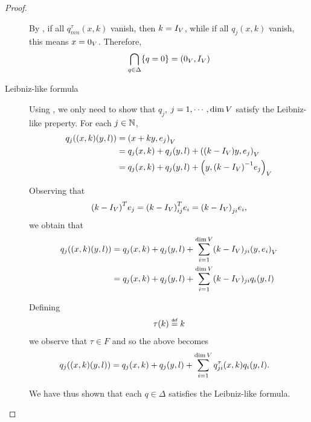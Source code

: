 \begin{proof}
\begin{description}
            By \cite[Lemma 5.11]{Fischer2015},
            if all $q^\tau_{m n}(x, k)$ vanish, then $k = {I_{V}}$,
            while if all $q_j(x, k)$ vanish, this means $x = 0_V$.
            Therefore,
            \begin{align*}
                \bigcap_{q \in \Delta} \{q = 0\} = (0_V, {I_{V}})
            \end{align*}
        \item [Leibniz-like formula]
            Using \cite[Corollary 5.13]{Fischer2015},
            we only need to show that $q_j$, $j = 1, \cdots, \dim V$ satisfy the Leibniz-like preperty.
            For each $j \in \mathbb{N}$,
            \begin{align*}
                q_j((x, k) (y, l))
                &= {\left(x + k y, e_j\right)_{V}}\\
                &= q_j(x, k) + q_j(y, l) + {\left((k - {I_{V}}) y, e_j\right)_{V}}\\
                &= q_j(x, k) + q_j(y, l) + {\left(y, {(k - {I_{V}})}^{-1} e_j\right)_{V}}
            \end{align*}

            Observing that
            \begin{align*}
                {(k - {I_{V}})}^T e_j
                = {(k - {I_{V}})}^T_{i j} e_i
                = {(k - {I_{V}})}_{j i} e_i,
            \end{align*}
            we obtain that
            \begin{align*}
                q_j((x, k) (y, l))
                &= q_j(x, k) + q_j(y, l) + \sum_{i = 1}^{\dim V} (k - {I_{V}})_{j i} {\left(y, e_i\right)_{V}}\\
                &= q_j(x, k) + q_j(y, l) + \sum_{i = 1}^{\dim V} (k - {I_{V}})_{j i} q_i(y, l)
            \end{align*}

            Defining
            \begin{align*}
                \tau(k) \defeq k
            \end{align*}
            we observe that $\tau \in F$ and so the above becomes
            \begin{align*}
                q_j((x, k) (y, l))
                &= q_j(x, k) + q_j(y, l) + \sum_{i = 1}^{\dim V} q^{\tau}_{j i}(x, k) q_i(y, l).
            \end{align*}

            We have thus shown that each $q \in \Delta$ satisfies the Leibniz-like formula.
    \end{description}
\end{proof}


